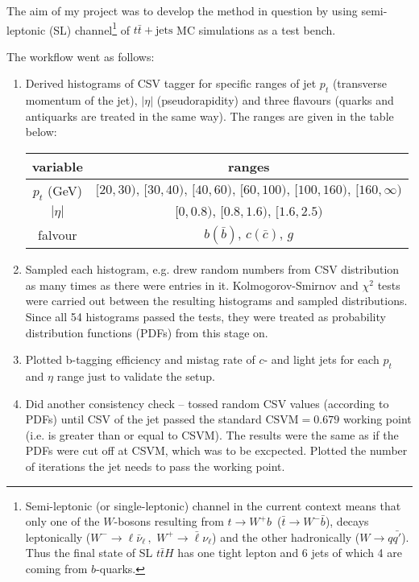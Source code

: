 \documentclass[12pt,a4paper]{article}
\begin{document}
The aim of my project was to develop the method in question by using semi-leptonic (SL) channel\footnote{Semi-leptonic (or single-leptonic) channel in the current context means that only one of the $W$-bosons resulting from $t\to W^+b\,$ ($\bar{t}\to W^-\bar{b}$), decays leptonically ($W^-\to \mathcal{\ell}\bar{\nu}_\mathcal{\ell}\,,\,\,W^+\to \bar{\mathcal{\ell}}\nu_\mathcal{\ell}$) and the other hadronically ($W\to q\bar{q'}$). Thus the final state of SL $t\bar{t}H$ has one tight lepton and 6 jets of which 4 are coming from $b$-quarks.}
of $t\bar{t}+\mbox{jets}$ MC simulations as a test bench.

\noindent The workflow went as follows:
\begin{enumerate}
\item Derived histograms of CSV tagger for specific ranges of jet $p_t$ (transverse momentum of the jet), $|\eta|$ (pseudorapidity) and three flavours (quarks and antiquarks are treated in the same way).
The ranges are given in the table below:
\begin{center}
	\begin{tabular}{ c | c }
		\hline
		variable & ranges \\ \hline
		$p_t$ (GeV) & $[20,30),\,[30,40),\,[40,60),\,[60,100),\,[100,160),\,[160,\infty)$ \\ \hline
		$|\eta|$ & $[0,0.8),\,[0.8,1.6),\,[1.6,2.5)$ \\ \hline
		falvour & $b(\bar{b})$, $c(\bar{c})$, $g$ \\
	\end{tabular}
\end{center}
\item Sampled each histogram, e.g. drew random numbers from CSV distribution as many times as there were entries in it.
Kolmogorov-Smirnov and $\chi^2$ tests were carried out between the resulting histograms and sampled distributions.
Since all 54 histograms passed the tests, they were treated as probability distribution functions (PDFs) from this stage on.
\item Plotted b-tagging efficiency and mistag rate of $c$- and light jets for each $p_t$ and $\eta$ range just to validate the setup.
\item Did another consistency check -- tossed random CSV values (according to PDFs) until CSV of the jet passed the standard $\mbox{CSVM}=0.679$ working point (i.e. is greater than or equal to CSVM).
{\color{red}The results were the same as if the PDFs were cut off at CSVM, which was to be excpected.}
Plotted the number of iterations the jet needs to pass the working point.

\end{enumerate}
\end{document}
